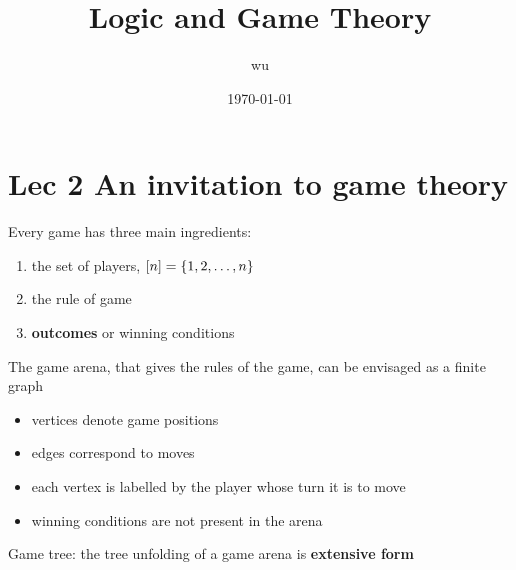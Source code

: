 \documentclass[11pt]{article}
\author{wu}
\date{\today}
\title{Logic and Game Theory}
\begin{document}
\maketitle
\tableofcontents


\section{Lec 2 An invitation to game theory}
\label{sec:org140cbc1}
Every game has three main ingredients:
\begin{enumerate}
\item the set of players, \([n]=\left\{ 1,2,\dots,n\right\}\)
\item the rule of game
\item \textbf{outcomes} or winning conditions
\end{enumerate}


The game arena, that gives the rules of the game, can be envisaged as a finite
graph
\begin{itemize}
\item vertices denote game positions
\item edges correspond to moves
\item each vertex is labelled by the player whose turn it is to move
\item winning conditions are not present in the arena
\end{itemize}


Game tree: the tree unfolding of a game arena is \textbf{extensive form}
\end{document}

